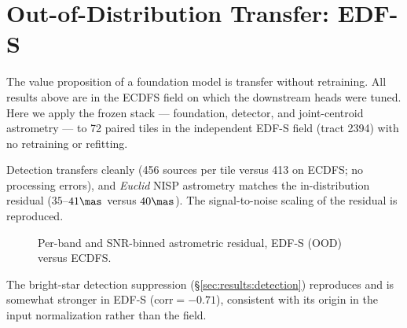 \section{Out-of-Distribution Transfer: EDF-S}
\label{sec:ood}

The value proposition of a foundation model is transfer without retraining. All
results above are in the ECDFS field on which the downstream heads were tuned.
Here we apply the frozen \jaisp{} stack --- foundation, detector, and
joint-centroid astrometry --- to 72 paired tiles in the independent EDF-S field
(tract 2394) with no retraining or refitting.


Detection transfers cleanly (456 sources per tile versus 413 on ECDFS; no
processing errors), and \textit{Euclid} NISP astrometry matches the
in-distribution residual ($35$--$41\mas$ versus $40\mas$). The signal-to-noise
scaling of the residual is reproduced. 

\begin{figure}
  \centering
  \caption{Per-band and SNR-binned astrometric residual, EDF-S (OOD) versus
    ECDFS. }
  \label{fig:ood}
\end{figure}

The bright-star detection suppression (\S\ref{sec:results:detection})
reproduces and is somewhat stronger in EDF-S ($\mathrm{corr}=-0.71$),
consistent with its origin in the input normalization rather than the field.
